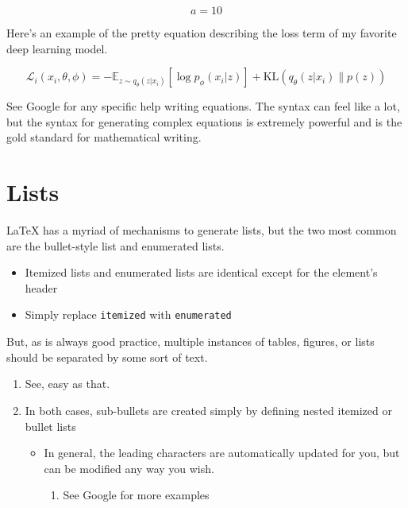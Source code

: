\begin{equation}
\label{eq:a}
a = 10
\end{equation}

Here's an example of the pretty equation describing the loss term of my favorite deep learning model.

\begin{equation} 
\label{eq:vaeloss}
\mathcal{L}_i(x_i, \theta, \phi) = -\mathbb{E}_{z\sim q_\theta(z|x_i)}[\log p_\phi (x_i | z)] + \text{KL}(q_\theta(z|x_i)\|p(z))
\end{equation}

See Google for any specific help writing equations.
The syntax can feel like a lot, but the syntax for generating complex equations is extremely powerful and is the gold standard for mathematical writing. 


\section{Lists}

LaTeX has a myriad of mechanisms to generate lists, but the two most common are the bullet-style list and enumerated lists.

\begin{itemize}
\item Itemized lists and enumerated lists are identical except for the element's header
\item Simply replace \texttt{itemized} with \texttt{enumerated}
\end{itemize}

But, as is always good practice, multiple instances of tables, figures, or lists should be separated by some sort of text.

\begin{enumerate}
\item See, easy as that.
\item In both cases, sub-bullets are created simply by defining nested itemized or bullet lists
\begin{itemize}
\item In general, the leading characters are automatically updated for you, but can be modified any way you wish.
\begin{enumerate}
\item See Google for more examples
\end{enumerate}
\end{itemize}
\end{enumerate}

